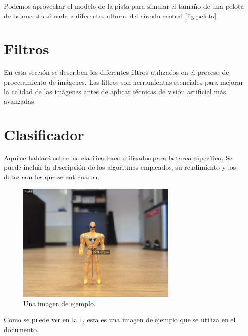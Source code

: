 \documentclass[12pt]{article}
\begin{document}
Podemos aprovechar el modelo de la pista para simular el tamaño de una pelota de baloncesto situada a diferentes alturas del círculo central \ref{fig:pelota}. 


\newpage

\section{Filtros}
En esta sección se describen los diferentes filtros utilizados en el proceso de procesamiento de imágenes. Los filtros son herramientas esenciales para mejorar la calidad de las imágenes antes de aplicar técnicas de visión artificial más avanzadas.



\newpage

\section{Clasificador}
Aquí se hablará sobre los clasificadores utilizados para la tarea específica. Se puede incluir la descripción de los algoritmos empleados, su rendimiento y los datos con los que se entrenaron.


\begin{figure}[h!]
    \centering
    \includegraphics[width=0.7\textwidth]{images_calibracion/Altura_objeto.png}  %
    \caption{Una imagen de ejemplo.}
    \label{fig:imagen_ejemplo}
\end{figure}

Como se puede ver en la \ref{fig:imagen_ejemplo}, esta es una imagen de ejemplo que se utiliza en el documento.
\end{document}
